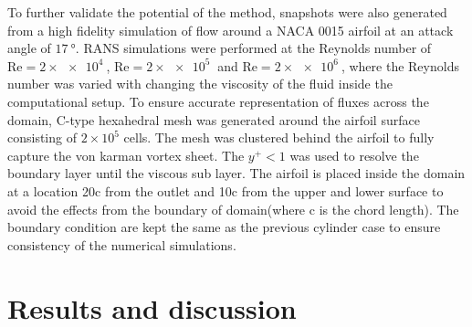 \documentclass[3p,times,procedia]{elsarticle}
\begin{document}
To further validate the potential of the method, snapshots were also generated
from a high fidelity simulation of flow around a NACA 0015 airfoil at an attack
angle of $\SI{17}{\degree}$. RANS simulations were performed at the Reynolds
number of $\text{Re} = 2\times \SI{e4}{}$, $\text{Re} = 2\times \SI{e5}{}$ and
$\text{Re} = 2\times \SI{e6}{}$, where the Reynolds number was varied with
changing the viscosity of the fluid inside the computational setup. To ensure
accurate representation of fluxes across the domain, C-type hexahedral mesh was
generated around the airfoil surface consisting of $2\times10^5$ cells. The mesh
was clustered behind the airfoil to fully capture the von karman vortex sheet.
The $y^{+}<1$ was used to resolve the boundary layer until the viscous sub
layer. The airfoil is placed inside the domain at a location 20c from the outlet
and 10c from the upper and lower surface to avoid the effects from the boundary
of domain(where c is the chord length). The boundary condition are kept the same
as the previous cylinder case to ensure consistency of the numerical
simulations.

\section{Results and discussion}
\end{document}
